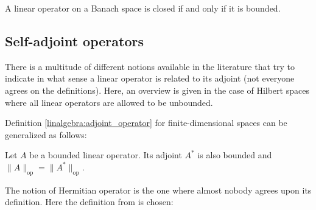     \begin{theorem}
        A linear operator on a Banach space is closed if and only if it is bounded.
    \end{theorem}

\subsection{Self-adjoint operators}

    There is a multitude of different notions available in the literature that try to indicate in what sense a linear operator is related to its adjoint (not everyone agrees on the definitions). Here, an overview is given in the case of Hilbert spaces where all linear operators are allowed to be unbounded.

    Definition \ref{linalgebra:adjoint_operator} for finite-dimensional spaces can be generalized as follows:
    \begin{property}
        Let $A$ be a bounded linear operator. Its adjoint $A^*$ is also bounded and $\|A\|_\mathrm{op} = \|A^*\|_\mathrm{op}$.
    \end{property}


    The notion of Hermitian operator is the one where almost nobody agrees upon its definition. Here the definition from \cite{nlab} is chosen:

